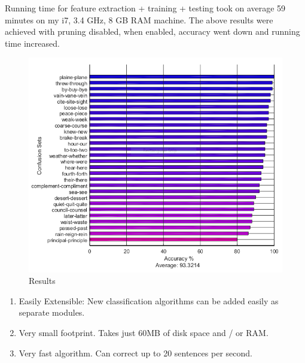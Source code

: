 
Running time for feature extraction + training + testing took on average 59
minutes on my i7, 3.4 GHz, 8 GB RAM machine. The above results were achieved
with pruning disabled, when enabled, accuracy went down and running time
increased.

\begin{figure}[H]
    \centering
    \caption{Results}
    \includegraphics[width=135mm]{img/results.png}
\end{figure}


\begin{enumerate}
\item Easily Extensible: New classification algorithms can be added easily as separate modules.
\item Very small footprint. Takes just 60MB of disk space and / or RAM.
\item Very fast algorithm. Can correct up to 20 sentences per second.
\end{enumerate}


